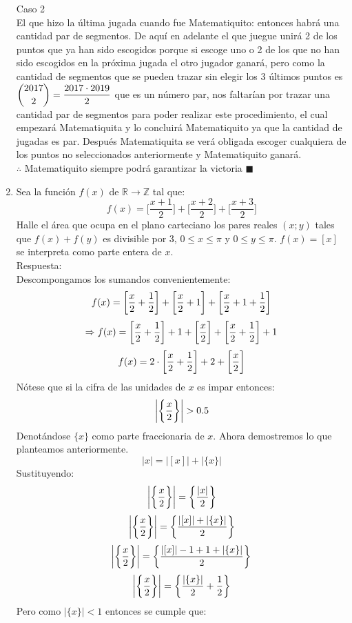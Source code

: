 \documentclass{book}
\newcommand{\R}{\mathbb{R}} \newcommand{\N}{\mathbb{N}}
\newcommand{\Z}{\mathbb{Z}} \def\max{\mathop{\mbox{\rm máx}}} %
\begin{document}
\begin{enumerate}
          Caso 2\\
          El que hizo la última jugada cuando fue Matematiquito: entonces habrá una cantidad par de segmentos. De aquí en adelante el que juegue unirá 2 de los puntos que ya han sido escogidos porque si escoge uno o 2 de los que no han sido escogidos en la próxima jugada el otro jugador ganará, pero como la cantidad de segmentos que se pueden trazar sin elegir los 3 últimos puntos es $\displaystyle{{2017 \choose 2}={2017\cdot 2019\over 2}}$ que es un número par, nos faltarían por trazar una cantidad par de segmentos para poder realizar este procedimiento, el cual empezará Matematiquita y lo concluirá Matematiquito ya que la cantidad de jugadas es par. Después Matematiquita se verá obligada escoger cualquiera de los puntos no seleccionados anteriormente y Matematiquito ganará.\\
          $\therefore$ Matematiquito siempre podrá garantizar la victoria $\blacksquare$\\
    \item  Sea la función $f(x)$ de $\R\rightarrow\Z$ tal que:
          $$f(x)=\bigg[\frac{x+1}{2}\bigg]+\bigg[\frac{x+2}{2}\bigg]+\bigg[\frac{x+3}{2}\bigg]$$
          Halle el área que ocupa en el plano carteciano los pares reales $(x;y)$ tales que $f(x)+f(y)$ es divisible por 3, $0\leq x\leq\pi$ y $0\leq y\leq \pi$.
          $f(x)=[x]$ se interpreta como parte entera de $x$.\\
          Respuesta:\\
          Descompongamos los sumandos convenientemente:
          $$f(x)=\bigg[{x\over 2}+{1\over 2}\bigg]+\bigg[{x\over 2}+1\bigg]+\bigg[{x\over 2}+1+{1\over 2}\bigg]$$
          $$\Rightarrow f(x)=\bigg[{x\over 2}+{1\over 2}\bigg]+1+\bigg[{x\over 2}\bigg]+\bigg[{x\over 2}+{1\over 2}\bigg]+1$$
          $$f(x)=2\cdot\bigg[{x\over 2}+{1\over 2}\bigg]+2+\bigg[{x\over 2}\bigg]$$
          Nótese que si la cifra de las unidades de $x$ es impar entonces:
          $$\bigg|\bigg\{{x\over 2}\bigg\}\bigg|>0.5$$
          Denotándose $\{x\}$ como parte fraccionaria de $x$. Ahora demostremos lo que planteamos anteriormente.
          $$|x|=|[x]|+|\{x\}|$$
          Sustituyendo:
          $$\bigg|\bigg\{{x\over 2}\bigg\}\bigg|=\bigg\{{|x|\over 2}\bigg\}$$
          $$\bigg|\bigg\{{x\over 2}\bigg\}\bigg|=\bigg\{\frac{|[x]|+|\{x\}|}{2}\bigg\}$$
          $$\bigg|\bigg\{{x\over 2}\bigg\}\bigg|=\bigg\{\frac{|[x]|-1+1+|\{x\}|}{2}\bigg\}$$
          $$\bigg|\bigg\{{x\over 2}\bigg\}\bigg|=\bigg\{\frac{|\{x\}|}{2}+{1\over 2}\bigg\}$$
          Pero como $|\{x\}|<1$ entonces se cumple que:

\end{enumerate}
\end{document}
